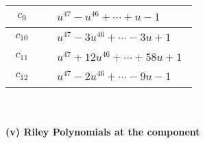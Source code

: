 \documentclass[1p]{elsarticle_modified}
\theoremstyle{definition}
\begin{document}
\begin{tabular}{m{50pt}|m{274pt}}
\hline $$\begin{aligned}c_{9}\end{aligned}$$&$\begin{aligned}
&u^{47}- u^{46}+\cdots+u-1
\end{aligned}$\\
\hline $$\begin{aligned}c_{10}\end{aligned}$$&$\begin{aligned}
&u^{47}-3 u^{46}+\cdots-3 u+1
\end{aligned}$\\
\hline $$\begin{aligned}c_{11}\end{aligned}$$&$\begin{aligned}
&u^{47}+12 u^{46}+\cdots+58 u+1
\end{aligned}$\\
\hline $$\begin{aligned}c_{12}\end{aligned}$$&$\begin{aligned}
&u^{47}-2 u^{46}+\cdots-9 u-1
\end{aligned}$\\
\hline
\end{tabular}\\~\\
\newpage\renewcommand{\arraystretch}{1}
\flushleft \textbf{(v) Riley Polynomials at the component}\newline \\
\end{document}
